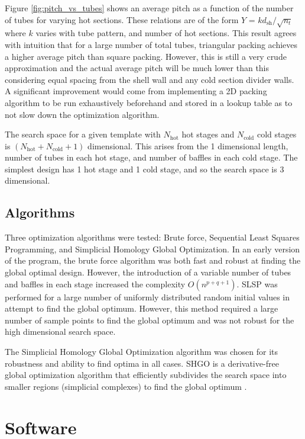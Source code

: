 \documentclass{article}
\begin{document}
Figure \ref{fig:pitch_vs_tubes} shows an average pitch as a function of the number of tubes for varying hot sections.
These relations are of the form $Y$ = $k d_\text{sh} /\sqrt{n_t}$ where $k$ varies with tube pattern, and number of hot sections.
This result agrees with intuition that for a large number of total tubes, triangular packing achieves a higher average pitch than square packing.
However, this is still a very crude approximation and the actual average pitch will be much lower than this considering equal spacing from the shell wall and any cold section divider walls.
A significant improvement would come from implementing a 2D packing algorithm to be run exhaustively beforehand and stored in a lookup table as to not slow down the optimization algorithm.

The search space for a given template with $N_\text{hot}$ hot stages and $N_\text{cold}$ cold stages is $(N_\text{hot} + N_\text{cold} + 1)$ dimensional.
This arises from the 1 dimensional length, number of tubes in each hot stage, and number of baffles in each cold stage.
The simplest design has 1 hot stage and 1 cold stage, and so the search space is 3 dimensional.

\subsection{Algorithms}
Three optimization algorithms were tested: Brute force, Sequential Least Squares Programming, and Simplicial Homology Global Optimization.
In an early version of the program, the brute force algorithm was both fast and robust at finding the global optimal design.
However, the introduction of a variable number of tubes and baffles in each stage increased the complexity $O(n^{p+q+1})$.
SLSP was performed for a large number of uniformly distributed random initial values in attempt to find the global optimum.
However, this method required a large number of sample points to find the global optimum and was not robust for the high dimensional search space.

The Simplicial Homology Global Optimization algorithm was chosen for its robustness and ability to find optima in all cases.
SHGO is a derivative-free global optimization algorithm that efficiently subdivides the search space into smaller regions (simplicial complexes) to find the global optimum \cite{SHGO}.

\section{Software}
\end{document}
